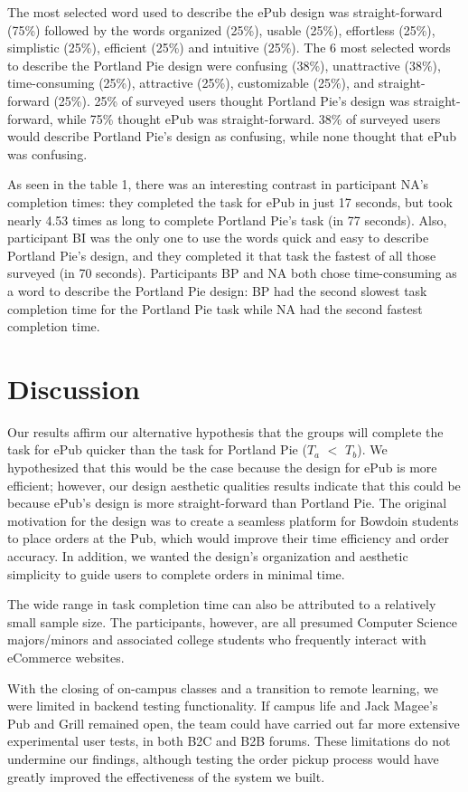 \documentclass[runningheads]{llncs}
\begin{document}
The most selected word used to describe the ePub design was straight-forward (75\%) followed by the words organized (25\%), usable (25\%), effortless (25\%), simplistic (25\%), efficient (25\%) and intuitive (25\%). The 6 most selected words to describe the Portland Pie design were confusing (38\%), unattractive (38\%), time-consuming (25\%), attractive (25\%), customizable (25\%), and straight-forward (25\%). 25\% of surveyed users thought Portland Pie’s design was straight-forward, while 75\% thought ePub was straight-forward. 38\% of surveyed users would describe Portland Pie’s design as confusing, while none thought that ePub was confusing.

As seen in the table 1, there was an interesting contrast in participant NA’s completion times: they completed the task for ePub in just 17 seconds, but took nearly 4.53 times as long to complete Portland Pie’s task (in 77 seconds). Also, participant BI was the only one to use the words quick and easy to describe Portland Pie’s design, and they completed it that task the fastest of all those surveyed (in 70 seconds). Participants BP and NA both chose time-consuming as a word to describe the Portland Pie design: BP had the second slowest task completion time for the Portland Pie task while NA had the second fastest completion time.

\section{Discussion}
Our results affirm our alternative hypothesis that the groups will complete the task for ePub quicker than the task for Portland Pie ($T_a$ $<$ $T_b$). We hypothesized that this would be the case because the design for ePub is more efficient; however, our design aesthetic qualities results indicate that this could be because ePub’s design is more straight-forward than Portland Pie. The original motivation for the design was to create a seamless platform for Bowdoin students to place orders at the Pub, which would improve their time efficiency and order accuracy. In addition, we wanted the design’s organization and aesthetic simplicity to guide users to complete orders in minimal time.

The wide range in task completion time can also be attributed to a relatively small sample size. The participants, however, are all presumed Computer Science majors/minors and associated college students who frequently interact with eCommerce websites.

With the closing of on-campus classes and a transition to remote learning, we were limited in backend testing functionality. If campus life and Jack Magee’s Pub and Grill remained open, the team could have carried out far more extensive experimental user tests, in both B2C and B2B forums. These limitations do not undermine our findings, although testing the order pickup process would have greatly improved the effectiveness of the system we built.
\end{document}
